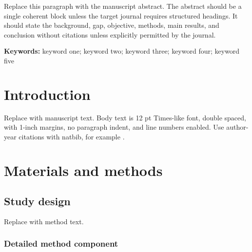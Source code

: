 \documentclass[12pt]{article}
\begin{document}
Replace this paragraph with the manuscript abstract. The abstract should be a
single coherent block unless the target journal requires structured headings.
It should state the background, gap, objective, methods, main results, and
conclusion without citations unless explicitly permitted by the journal.

\noindent\textbf{Keywords:} keyword one; keyword two; keyword three; keyword four; keyword five


\section{Introduction}\label{introduction}

Replace with manuscript text. Body text is 12 pt Times-like font, double
spaced, with 1-inch margins, no paragraph indent, and line numbers enabled.
Use author-year citations with natbib, for example \citep{example2024}.

\section{Materials and methods}\label{materials-and-methods}

\subsection{Study design}\label{study-design}

Replace with method text.

\subsubsection{Detailed method component}\label{detailed-method-component}
\end{document}
